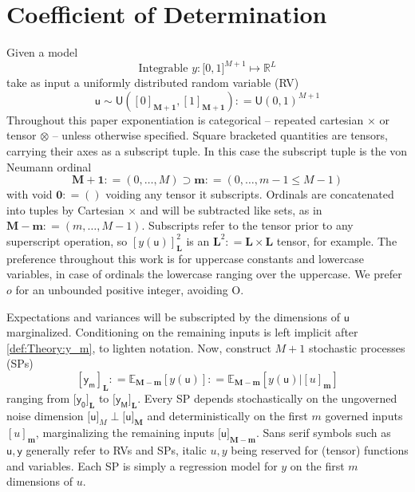 \documentclass[preprint,12pt]{elsarticle}
\newcommand*{\M}[1]{\ensuremath{#1}\xspace}
\newcommand*{\x}{\times}
\newcommand*{\mi}[1]{\mathbf{#1}}
\newcommand*{\st}[1]{\mathbb{#1}}
\newcommand*{\rv}[1]{\mathsf{#1}}
\newcommand*{\te}[2][]{\left\lbrack{#2}\right\rbrack_{#1}}
\newcommand*{\tte}[2][]{\lbrack{#2}\rbrack_{#1}}
\newcommand*{\deq}{\M{\mathrel{\mathop:}=}}
\newcommand{\T}[1]{\text{#1}}
\newcommand*{\ev}[3][]{\mathbb{E}_{#3}^{#1}\!\left\lbrack{#2}\right\rbrack}
\newcommand*{\uni}[2]{\mathsf{U}\!\left({#1,#2}\right)}
\newcommand*{\uniti}{\lbrack 0,1\rbrack}
\begin{document}
\section{Coefficient of Determination}\label{sec:COD}
    Given a model
    \begin{equation*}
        \T{Integrable } y \colon \uniti^{M+1} \mapsto \st{R}^{L}
    \end{equation*}
    take as input a uniformly distributed random variable (RV)
    \begin{equation*}
        \rv{u} \sim \uni{\te[\mi{M+1}]{0}}{\te[\mi{M+1}]{1}} \deq \uni{0}{1}^{M+1}
    \end{equation*}
    Throughout this paper exponentiation is categorical -- repeated cartesian $\x$ or tensor $\otimes$ -- unless otherwise specified. Square bracketed quantities are tensors, carrying their axes as a subscript tuple. In this case the subscript tuple is the von Neumann ordinal
    \begin{equation*}
        \mi{M+1} \deq (0,\ldots,M) \supset \mi{m} \deq (0,\ldots,m-1 \leq M-1)
    \end{equation*}
    with void $\mi{0}\deq ()$ voiding any tensor it subscripts. Ordinals are concatenated into tuples by Cartesian $\times$ and will be subtracted like sets, as in $\mi{M-m} \deq (m,\ldots,M-1)$. 
    Subscripts refer to the tensor prior to any superscript operation, so $\te[\mi{L}]{y(\rv{u})}^{2}$ is an $\mi{L}^{2} \deq \mi{L\x L}$ tensor, for example.
    The preference throughout this work is for uppercase constants and lowercase variables, in case of ordinals the lowercase ranging over the uppercase. We prefer $o$ for an unbounded positive integer, avoiding O.

    Expectations and variances will be subscripted by the dimensions of $\rv{u}$ marginalized. Conditioning on the remaining inputs is left implicit after \cref{def:Theory:y_m}, to lighten notation.
    Now, construct $M+1$ stochastic processes (SPs)
    \begin{equation}\label{def:Theory:y_m}
        \te[\mi{L}]{\rv{y_m}} \deq \ev{y(\rv{u})}{\mi{M-m}} \deq \ev{y(\rv{u}) \big\vert \te[\mi{m}]{u}}{\mi{M-m}}
    \end{equation}
    ranging from $\tte[\mi{L}]{\rv{y_0}}$ to $\tte[\mi{L}]{\rv{y_M}}$. Every SP depends stochastically on the ungoverned noise dimension $\tte[M]{\rv{u}} \perp \tte[\mi{M}]{\rv{u}}$ and deterministically on the first $m$ governed inputs $\te[\mi{m}]{u}$, marginalizing the remaining inputs $\tte[\mi{M-m}]{\rv{u}}$. 
    Sans serif symbols such as $\rv{u,y}$ generally refer to RVs and SPs, italic $u,y$ being reserved for (tensor) functions and variables. Each SP is simply a regression model for $y$ on the first $m$ dimensions of $u$.
    
\end{document}
